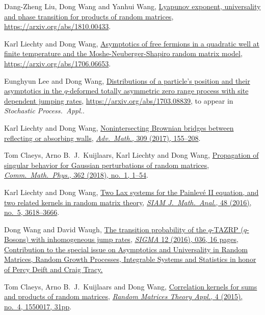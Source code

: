 \documentclass[12pt,a4paper]{article}
\begin{document}
\begin{etaremune}
\item
  Dang-Zheng Liu, Dong Wang and Yanhui Wang, \href{https://arxiv.org/abs/1810.00433}{Lyapunov exponent, universality and phase transition for products of random matrices}, \url{https://arxiv.org/abs/1810.00433}.
\item
  Karl Liechty and Dong Wang, \href{https://arxiv.org/abs/1706.06653}{Asymptotics of free fermions in a quadratic well at finite temperature and the Moshe-Neuberger-Shapiro random matrix model}, \url{https://arxiv.org/abs/1706.06653}.
\item
  Eunghyun Lee and Dong Wang, \href{https://arxiv.org/abs/1703.08839}{Distributions of a particle's position and their asymptotics in the $q$-deformed totally asymmetric zero range process with site dependent jumping rates}, \url{https://arxiv.org/abs/1703.08839}, to appear in \textit{Stochastic Process.\ Appl.}.
\item
  Karl Liechty and Dong Wang, \href{http://arxiv.org/abs/1608.08712}{Nonintersecting Brownian bridges between reflecting or absorbing walls}, \href{https://doi.org/10.1016/j.aim.2016.10.024}{\textit{Adv.\ Math.}, 309 (2017), 155--208}.
\item
  Tom Claeys, Arno B.~J.~Kuijlaars, Karl Liechty and Dong Wang, \href{http://arxiv.org/abs/1608.05870}{Propagation of singular behavior for Gaussian perturbations of random matrices}, \href{https://doi.org/10.1007/s00220-018-3195-8}{\textit{Comm.\ Math.\ Phys.}, 362 (2018), no.\ 1, 1--54}.
\item
  Karl Liechty and Dong Wang, \href{http://arxiv.org/abs/1601.01603}{Two Lax systems for the Painlev\'{e} II equation, and two related kernels in random matrix theory}, \href{https://doi.org/10.1137/16M1056080}{\textit{SIAM J.\ Math.\ Anal.}, 48 (2016), no.\ 5, 3618--3666}.
\item
  Dong Wang and David Waugh, \href{http://arxiv.org/abs/1512.01612}{The transition probability of the $q$-TAZRP ($q$-Bosons) with inhomogeneous jump rates}, \href{https://doi.org/10.3842/SIGMA.2016.037}{\textit{SIGMA} 12 (2016), 036, 16 pages, Contribution to the special issue on Asymptotics and Universality in Random Matrices, Random Growth Processes, Integrable Systems and Statistics in honor of Percy Deift and Craig Tracy.}
\item 
  Tom Claeys, Arno B.~J.~Kuijlaars and Dong Wang, \href{http://arxiv.org/abs/1505.00610}{Correlation kernels for sums and products of random matrices}, \href{https://doi.org/10.1142/S2010326315500173}{\textit{Random Matrices Theory Appl.}, 4 (2015), no.\ 4, 1550017, 31pp}.

\end{etaremune}
\end{document}
